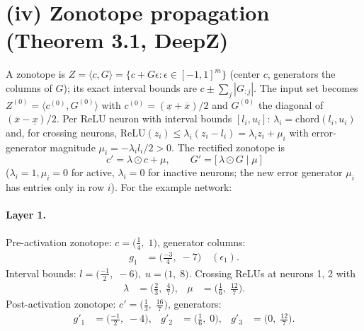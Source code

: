 \documentclass[11pt]{article}
\begin{document}
\section{(iv) Zonotope propagation (Theorem 3.1, DeepZ)}
A zonotope is $Z = \langle c, G \rangle = \{c + G\epsilon : \epsilon \in [-1,1]^m\}$
(center $c$, generators the columns of $G$); its exact interval bounds are
$c \pm \sum_j |G_{:j}|$. The input set becomes $Z^{(0)} = \langle c^{(0)}, G^{(0)} \rangle$ with
$c^{(0)} = (\underline{x} + \overline{x})/2$ and $G^{(0)}$ the diagonal of $(\overline{x} - \underline{x})/2$.
Per ReLU neuron with interval bounds $[l_i, u_i]$:
$\lambda_i = \mathrm{chord}(l_i, u_i)$ and, for crossing neurons,
$\mathrm{ReLU}(z_i) \le \lambda_i (z_i - l_i) = \lambda_i z_i + \mu_i$ with error-generator magnitude
$\mu_i = -\lambda_i l_i / 2 > 0$. The rectified zonotope is
\begin{equation*}
c' = \lambda \odot c + \mu, \qquad G' = \bigl[\, \lambda \odot G \;\big|\; \mu\, \bigr]
\end{equation*}
($\lambda_i = 1, \mu_i = 0$ for active, $\lambda_i = 0$ for inactive neurons;
the new error generator $\mu_i$ has entries only in row $i$).
For the example network:
\paragraph{Layer 1.}
Pre-activation zonotope: $c = \bigl(\frac{1}{4},\; 1\bigr)$, generator columns:
\begin{align*}
g_{1} &= \bigl(\frac{-3}{4},\; -7\bigr) \quad (\epsilon_{1}).
\end{align*}
Interval bounds: $l = \bigl(\frac{-1}{2},\; -6\bigr), \; u = \bigl(1,\; 8\bigr)$. 
Crossing ReLUs at neurons 1, 2 with
\begin{align*}
\lambda &= \bigl(\frac{2}{3},\; \frac{4}{7}\bigr), & \mu &= \bigl(\frac{1}{6},\; \frac{12}{7}\bigr).
\end{align*}
Post-activation zonotope: $c' = \bigl(\frac{1}{3},\; \frac{16}{7}\bigr)$, generators:
\begin{align*}
g'_{1} &= \bigl(\frac{-1}{2},\; -4\bigr), &
g'_{2} &= \bigl(\frac{1}{6},\; 0\bigr), &
g'_{3} &= \bigl(0,\; \frac{12}{7}\bigr).
\end{align*}
\end{document}
